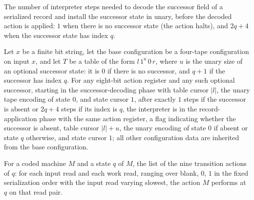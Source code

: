 \begin{definition}
\label{Turing.universalNextCost}
\leanok
The number of interpreter steps needed to decode the successor field of a
serialized record and install the successor state in unary, before the
decoded action is applied: $1$ when there is no successor state (the action
halts), and $2q + 4$ when the successor state has index $q$.
\end{definition}

\begin{lemma}
\label{Turing.universal_prepare_next}
\leanok
{}
Let $x$ be a finite bit string, let the base configuration be a four-tape configuration
on input $x$, and let $T$ be a table of the form $l\,1^u\,0\,r$, where $u$ is the unary
size of an optional successor state: it is $0$ if there is no successor, and $q+1$ if
the successor has index $q$. For any eight-bit action register and any such optional
successor, starting in the successor-decoding phase with table cursor $|l|$, the unary
tape encoding of state $0$, and state cursor $1$, after exactly $1$ steps if the
successor is absent or $2q+4$ steps if its index is $q$, the interpreter is in the
record-application phase with the same action register, a flag indicating whether the
successor is absent, table cursor $|l|+u$, the unary encoding of state $0$ if absent or
state $q$ otherwise, and state cursor $1$; all other configuration data are inherited
from the base configuration.
\end{lemma}

\begin{definition}
\label{Turing.universalActions}
\leanok
{}
For a coded machine $M$ and a state $q$ of $M$, the list of the nine
transition actions of $q$: for each input read and each work read, ranging
over blank, $0$, $1$ in the fixed serialization order with the input read
varying slowest, the action $M$ performs at $q$ on that read pair.
\end{definition}

